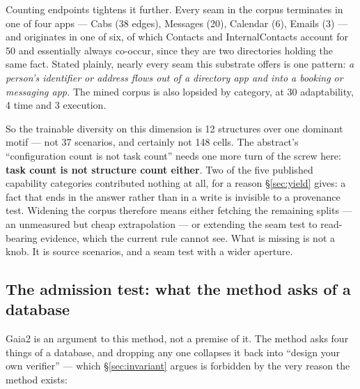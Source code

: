 \documentclass[11pt,a4paper]{article}
\begin{document}
Counting endpoints tightens it further. Every seam in the corpus terminates in one of four apps --- Cabs (38 edges), Messages (20), Calendar (6), Emails (3) --- and originates in one of six, of which Contacts and InternalContacts account for 50 and essentially always co-occur, since they are two directories holding the same fact. Stated plainly, nearly every seam this substrate offers is one pattern: \emph{a person's identifier or address flows out of a directory app and into a booking or messaging app.} The mined corpus is also lopsided by category, at 30 adaptability, 4 time and 3 execution.

So the trainable diversity on this dimension is 12 structures over one dominant motif --- not 37 scenarios, and certainly not 148 cells. The abstract's ``configuration count is not task count'' needs one more turn of the screw here: \textbf{task count is not structure count either}. Two of the five published capability categories contributed nothing at all, for a reason \S\ref{sec:yield} gives: a fact that ends in the answer rather than in a write is invisible to a provenance test. Widening the corpus therefore means either fetching the remaining splits --- an unmeasured but cheap extrapolation --- or extending the seam test to read-bearing evidence, which the current rule cannot see. What is missing is not a knob. It is source scenarios, and a seam test with a wider aperture.

\subsection{The admission test: what the method asks of a database}
\label{sec:substrate}

Gaia2 is an argument to this method, not a premise of it. The method asks four things of a database, and dropping any one collapses it back into ``design your own verifier'' --- which \S\ref{sec:invariant} argues is forbidden by the very reason the method exists:
\end{document}
